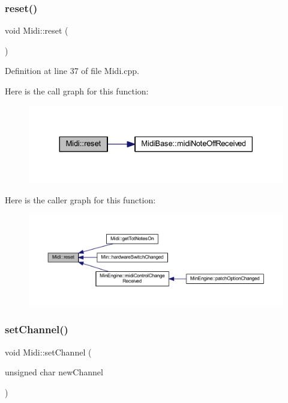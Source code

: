\subsubsection{\texorpdfstring{reset()}{reset()}}
{\footnotesize\ttfamily void Midi\+::reset (\begin{DoxyParamCaption}{ }\end{DoxyParamCaption})}



Definition at line 37 of file Midi.\+cpp.

Here is the call graph for this function\+:
\nopagebreak
\begin{figure}[H]
\begin{center}
\leavevmode
\includegraphics[width=330pt]{class_midi_a2b55e3e055e1076a4113374ec3c06056_cgraph}
\end{center}
\end{figure}
Here is the caller graph for this function\+:
\nopagebreak
\begin{figure}[H]
\begin{center}
\leavevmode
\includegraphics[width=350pt]{class_midi_a2b55e3e055e1076a4113374ec3c06056_icgraph}
\end{center}
\end{figure}
\mbox{\label{class_midi_ab4278443129bc124d46a9f06723283a6}} 
\subsubsection{\texorpdfstring{set\+Channel()}{setChannel()}}
{\footnotesize\ttfamily void Midi\+::set\+Channel (\begin{DoxyParamCaption}\item[{unsigned char}]{new\+Channel }\end{DoxyParamCaption})\hspace{0.3cm}{\ttfamily [inline]}}




